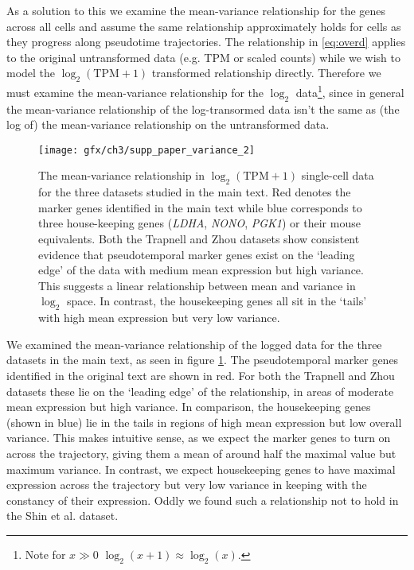 As a solution to this we examine the mean-variance relationship for the genes across all cells and assume the same relationship approximately holds for cells as they progress along pseudotime trajectories. The relationship in \ref{eq:overd} applies to the original untransformed data (e.g. TPM or scaled counts) while we wish to model the $\log_2(\text{TPM} + 1)$ transformed relationship directly. Therefore we must examine the mean-variance relationship for the $\log_2$ data\footnote{Note for $x \gg 0$ $\log_2(x+1) \approx \log_2(x)$.}, since in general the mean-variance relationship of the log-transormed data isn't the same as (the log of) the mean-variance relationship on the untransformed data.

\begin{figure}
\centering
 \texttt{[image: gfx/ch3/supp\_paper\_variance\_2]}
 \caption{The mean-variance relationship in $\log_2(\text{TPM} + 1)$ single-cell data for the three datasets studied in the main text. Red denotes the marker genes identified in the main text while blue corresponds to three house-keeping genes (\emph{LDHA}, \emph{NONO}, \emph{PGK1}) or their mouse equivalents. Both the Trapnell and Zhou datasets show consistent evidence that pseudotemporal marker genes exist on the `leading edge' of the data with medium mean expression but high variance. This suggests a linear relationship between mean and variance in $\log_2$ space. In contrast, the housekeeping genes all sit in the `tails' with high mean expression but very low variance.} \label{fig:variance}
 \end{figure}

We examined the mean-variance relationship of the logged data for the three datasets in the main text, as seen in figure \ref{fig:variance}. The pseudotemporal marker genes identified in the original text are shown in red. For both the Trapnell and Zhou datasets these lie on the `leading edge' of the relationship, in areas of moderate mean expression but high variance. In comparison, the housekeeping genes (shown in blue) lie in the tails in regions of high mean expression but low overall variance. This makes intuitive sense, as we expect the marker genes to turn on across the trajectory, giving them a mean of around half the maximal value but maximum variance. In contrast, we expect housekeeping genes to have maximal expression across the trajectory but very low variance in keeping with the constancy of their expression. Oddly we found such a relationship not to hold in the Shin et al. dataset.


